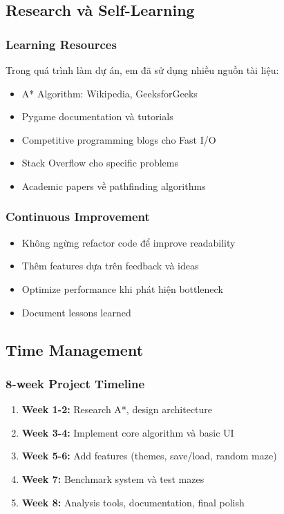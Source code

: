\documentclass[12pt,a4paper]{article}
\begin{document}
\subsection{Research và Self-Learning}

\subsubsection{Learning Resources}
Trong quá trình làm dự án, em đã sử dụng nhiều nguồn tài liệu:
\begin{itemize}
    \item A* Algorithm: Wikipedia, GeeksforGeeks
    \item Pygame documentation và tutorials
    \item Competitive programming blogs cho Fast I/O
    \item Stack Overflow cho specific problems
    \item Academic papers về pathfinding algorithms
\end{itemize}

\subsubsection{Continuous Improvement}
\begin{itemize}
    \item Không ngừng refactor code để improve readability
    \item Thêm features dựa trên feedback và ideas
    \item Optimize performance khi phát hiện bottleneck
    \item Document lessons learned
\end{itemize}

\subsection{Time Management}

\subsubsection{8-week Project Timeline}
\begin{enumerate}
    \item \textbf{Week 1-2:} Research A*, design architecture
    \item \textbf{Week 3-4:} Implement core algorithm và basic UI
    \item \textbf{Week 5-6:} Add features (themes, save/load, random maze)
    \item \textbf{Week 7:} Benchmark system và test mazes
    \item \textbf{Week 8:} Analysis tools, documentation, final polish
\end{enumerate}
\end{document}
